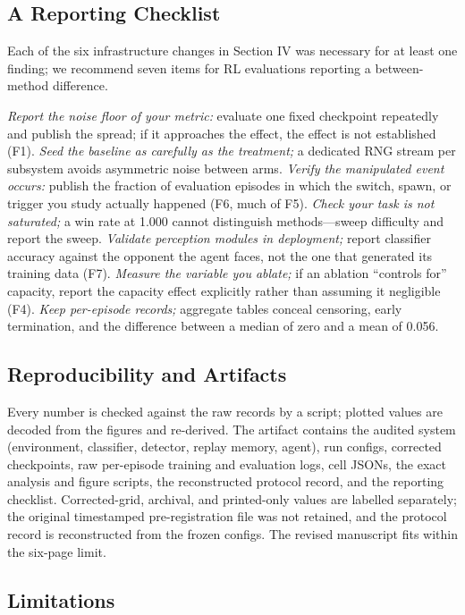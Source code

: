 \documentclass[conference,9pt]{IEEEtran}
\begin{document}
\subsection{A Reporting Checklist}

Each of the six infrastructure changes in Section IV was necessary for at least one finding; we recommend seven items for RL evaluations reporting a between-method difference.

\textit{Report the noise floor of your metric:} evaluate one fixed checkpoint repeatedly and publish the spread; if it approaches the effect, the effect is not established (F1). \textit{Seed the baseline as carefully as the treatment;} a dedicated RNG stream per subsystem avoids asymmetric noise between arms. \textit{Verify the manipulated event occurs:} publish the fraction of evaluation episodes in which the switch, spawn, or trigger you study actually happened (F6, much of F5). \textit{Check your task is not saturated;} a win rate at 1.000 cannot distinguish methods---sweep difficulty and report the sweep. \textit{Validate perception modules in deployment;} report classifier accuracy against the opponent the agent faces, not the one that generated its training data (F7). \textit{Measure the variable you ablate;} if an ablation ``controls for'' capacity, report the capacity effect explicitly rather than assuming it negligible (F4). \textit{Keep per-episode records;} aggregate tables conceal censoring, early termination, and the difference between a median of zero and a mean of 0.056.

\subsection{Reproducibility and Artifacts}

Every number is checked against the raw records by a script; plotted values are decoded from the figures and re-derived. The artifact contains the audited system (environment, classifier, detector, replay memory, agent), run configs, corrected checkpoints, raw per-episode training and evaluation logs, cell JSONs, the exact analysis and figure scripts, the reconstructed protocol record, and the reporting checklist. Corrected-grid, archival, and printed-only values are labelled separately; the original timestamped pre-registration file was not retained, and the protocol record is reconstructed from the frozen configs. The revised manuscript fits within the six-page limit.

\subsection{Limitations}
\end{document}
